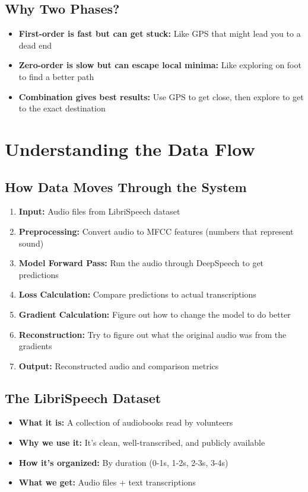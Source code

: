 \documentclass[12pt]{article}
\begin{document}
\subsection{Why Two Phases?}

\begin{itemize}
    \item \textbf{First-order is fast but can get stuck:} Like GPS that might lead you to a dead end
    \item \textbf{Zero-order is slow but can escape local minima:} Like exploring on foot to find a better path
    \item \textbf{Combination gives best results:} Use GPS to get close, then explore to get to the exact destination
\end{itemize}

\section{Understanding the Data Flow}

\subsection{How Data Moves Through the System}

\begin{enumerate}
    \item \textbf{Input:} Audio files from LibriSpeech dataset
    \item \textbf{Preprocessing:} Convert audio to MFCC features (numbers that represent sound)
    \item \textbf{Model Forward Pass:} Run the audio through DeepSpeech to get predictions
    \item \textbf{Loss Calculation:} Compare predictions to actual transcriptions
    \item \textbf{Gradient Calculation:} Figure out how to change the model to do better
    \item \textbf{Reconstruction:} Try to figure out what the original audio was from the gradients
    \item \textbf{Output:} Reconstructed audio and comparison metrics
\end{enumerate}

\subsection{The LibriSpeech Dataset}

\begin{itemize}
    \item \textbf{What it is:} A collection of audiobooks read by volunteers
    \item \textbf{Why we use it:} It's clean, well-transcribed, and publicly available
    \item \textbf{How it's organized:} By duration (0-1s, 1-2s, 2-3s, 3-4s)
    \item \textbf{What we get:} Audio files + text transcriptions
\end{itemize}
\end{document}
